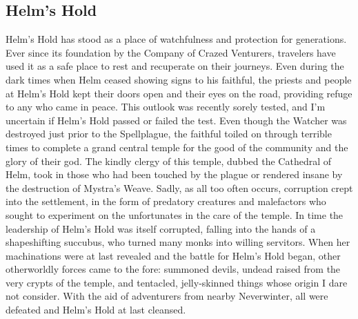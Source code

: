 \documentclass[10pt,a4paper,twoside,twocolumn,openany,bg=print,nodeprecatedcode]{dndbook}
\begin{document}
\subsection{Helm's Hold}
Helm's Hold has stood as a place of watchfulness and protection for generations. Ever since its foundation by the Company of Crazed Venturers, travelers have used it as a safe place to rest and recuperate on their journeys. Even during the dark times when Helm ceased showing signs to his faithful, the priests and people at Helm's Hold kept their doors open and their eyes on the road, providing refuge to any who came in peace. This outlook was recently sorely tested, and I'm uncertain if Helm's Hold passed or failed the test.
Even though the Watcher was destroyed just prior to the Spellplague, the faithful toiled on through terrible times to complete a grand central temple for the good of the community and the glory of their god. The kindly clergy of this temple, dubbed the Cathedral of Helm, took in those who had been touched by the plague or rendered insane by the destruction of Mystra's Weave. Sadly, as all too often occurs, corruption crept into the settlement, in the form of predatory creatures and malefactors who sought to experiment on the unfortunates in the care of the temple.
In time the leadership of Helm's Hold was itself corrupted, falling into the hands of a shapeshifting succubus, who turned many monks into willing servitors. When her machinations were at last revealed and the battle for Helm's Hold began, other otherworldly forces came to the fore: summoned devils, undead raised from the very crypts of the temple, and tentacled, jelly-skinned things whose origin I dare not consider. With the aid of adventurers from nearby Neverwinter, all were defeated and Helm's Hold at last cleansed.
\end{document}
